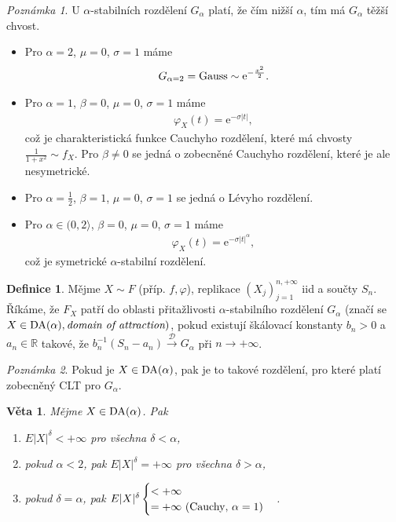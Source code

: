 \documentclass{article}
\newtheorem{theorem}[subsubsection]{Věta}
\theoremstyle{remark}
\newtheorem*{remark}{Poznámka}
\theoremstyle{plain}
\theoremstyle{definition}
\newtheorem{definition}[subsubsection]{Definice}
\theoremstyle{remark}
\begin{document}
\begin{remark}
U $\alpha$-stabilních rozdělení $G_\alpha$ platí, že čím nižší $\alpha$, tím má $G_\alpha$ těžší chvost. 
\begin{itemize}
    \item Pro $\alpha=2$, $\mu=0$, $\sigma=1$ máme
    \begin{align*}
        G_{\alpha=2}=\textnormal{Gauss}\sim\mathrm{e}^{-\frac{x^2}{2}}.
    \end{align*}
    \item Pro $\alpha=1$, $\beta=0$, $\mu=0$, $\sigma=1$ máme
    \begin{align*}
        \varphi_X(t)=\mathrm{e}^{-\sigma|t|},
    \end{align*}
    což je charakteristická funkce Cauchyho rozdělení, které má chvosty $\frac{1}{1+x^2}\sim f_X$. Pro $\beta\neq 0$ se jedná o zobecněné Cauchyho rozdělení, které je ale nesymetrické.
    \item Pro $\alpha=\frac{1}{2}$, $\beta=1$, $\mu=0$, $\sigma=1$ se jedná o Lévyho rozdělení.
    \item Pro $\alpha\in(0,2\rangle$, $\beta=0$, $\mu=0$, $\sigma=1$ máme
    \begin{align*}
        \varphi_X(t)=\mathrm{e}^{-\sigma|t|^{\alpha}},
    \end{align*}
    což je symetrické $\alpha$-stabilní rozdělení.
\end{itemize}
\end{remark}

\begin{definition}
Mějme $X\sim F$ (příp. $f,\varphi$), replikace $(X_j)_{j=1}^{n,+\infty}$ iid a součty $S_n$. Říkáme, že $F_X$ patří do oblasti přitažlivosti $\alpha$-stabilního rozdělení $G_\alpha$ (značí se $X\in\textnormal{DA}(\alpha), \textit{domain of attraction})$, pokud existují škálovací konstanty $b_n>0$ a $a_n\in\mathbb{R}$ takové, že  $b_n^{-1}(S_n-a_n)\xrightarrow{\mathscr{D}}G_\alpha$ při $n\rightarrow +\infty$.
\end{definition}

\begin{remark}
Pokud je $X\in\textnormal{DA}(\alpha)$, pak je to takové rozdělení, pro které platí zobecněný CLT pro $G_\alpha$.
\end{remark}

\begin{theorem}
Mějme $X\in\textnormal{DA}(\alpha)$. Pak
\begin{enumerate}
    \item $E|X|^\delta<+\infty$ pro všechna $\delta<\alpha$,
    \item pokud $\alpha<2$, pak $E|X|^\delta=+\infty$ pro všechna $\delta>\alpha$,
    \item pokud $\delta=\alpha$, pak $E|X|^\delta\begin{cases}
    <+\infty \\
    =+\infty\,\, (\textnormal{Cauchy},\, \alpha=1)
    \end{cases}$.
\end{enumerate}
\end{theorem}
\end{document}
